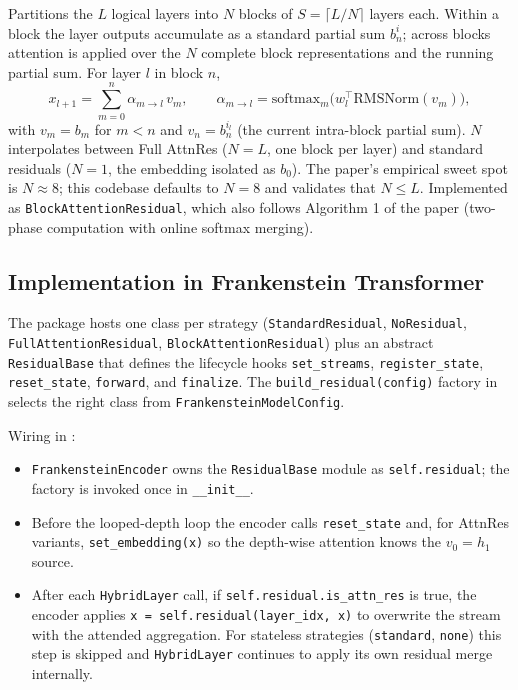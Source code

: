 Partitions the $L$ logical layers into $N$ blocks of
$S = \lceil L / N \rceil$ layers each. Within a block the layer outputs
accumulate as a standard partial sum $b_n^i$; across blocks attention
is applied over the $N$ complete block representations and the running
partial sum. For layer $l$ in block $n$,
\[
x_{l+1} = \sum_{m=0}^{n} \alpha_{m \to l} \, v_m, \qquad
\alpha_{m \to l} = \mathrm{softmax}_m\!\big(w_l^{\top} \mathrm{RMSNorm}(v_m)\big),
\]
with $v_m = b_m$ for $m < n$ and $v_n = b_n^{i_l}$ (the current
intra-block partial sum). $N$ interpolates between Full AttnRes
($N = L$, one block per layer) and standard residuals ($N = 1$, the
embedding isolated as $b_0$). The paper's empirical sweet spot is
$N \approx 8$; this codebase defaults to $N = 8$ and validates that
$N \le L$. Implemented as \texttt{BlockAttentionResidual}, which also
follows Algorithm 1 of the paper (two-phase computation with online
softmax merging).

\subsection{Implementation in Frankenstein Transformer}

The  package hosts one class per strategy
(\texttt{StandardResidual}, \texttt{NoResidual},
\texttt{FullAttentionResidual}, \texttt{BlockAttentionResidual}) plus
an abstract \texttt{ResidualBase} that defines the lifecycle hooks
\texttt{set\_streams}, \texttt{register\_state}, \texttt{reset\_state},
\texttt{forward}, and \texttt{finalize}. The
\texttt{build\_residual(config)} factory in
 selects the right class from
\texttt{FrankensteinModelConfig}.

Wiring in :
\begin{itemize}[leftmargin=*]
    \item \texttt{FrankensteinEncoder} owns the
        \texttt{ResidualBase} module as \texttt{self.residual}; the
        factory is invoked once in \texttt{\_\_init\_\_}.
    \item Before the looped-depth loop the encoder calls
        \texttt{reset\_state} and, for AttnRes variants,
        \texttt{set\_embedding(x)} so the depth-wise attention knows
        the $v_0 = h_1$ source.
    \item After each \texttt{HybridLayer} call, if
        \texttt{self.residual.is\_attn\_res} is true, the encoder
        applies \texttt{x = self.residual(layer\_idx, x)} to overwrite
        the stream with the attended aggregation. For stateless
        strategies (\texttt{standard}, \texttt{none}) this step is
        skipped and \texttt{HybridLayer} continues to apply its own
        residual merge internally.
\end{itemize}


